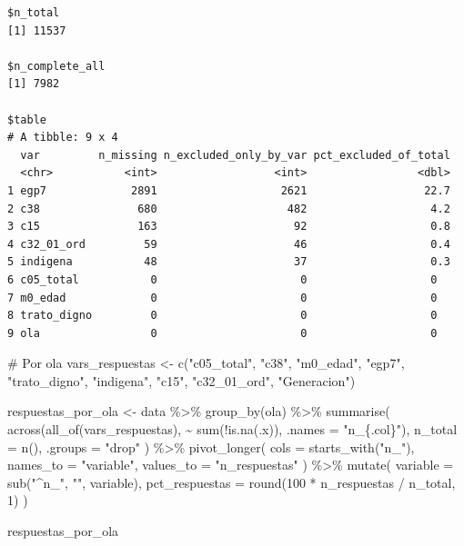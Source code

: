 \documentclass[
  spanish,
  a4paper,
  oneside]{scrbook}
\newenvironment{Shaded}{\begin{snugshade}}{\end{snugshade}}
\newcommand{\AttributeTok}[1]{\textcolor[rgb]{0.40,0.45,0.13}{#1}}
\newcommand{\CommentTok}[1]{\textcolor[rgb]{0.37,0.37,0.37}{#1}}
\newcommand{\DecValTok}[1]{\textcolor[rgb]{0.68,0.00,0.00}{#1}}
\newcommand{\FunctionTok}[1]{\textcolor[rgb]{0.28,0.35,0.67}{#1}}
\newcommand{\NormalTok}[1]{\textcolor[rgb]{0.00,0.23,0.31}{#1}}
\newcommand{\OtherTok}[1]{\textcolor[rgb]{0.00,0.23,0.31}{#1}}
\newcommand{\SpecialCharTok}[1]{\textcolor[rgb]{0.37,0.37,0.37}{#1}}
\newcommand{\StringTok}[1]{\textcolor[rgb]{0.13,0.47,0.30}{#1}}
\begin{document}
\begin{verbatim}
$n_total
[1] 11537

$n_complete_all
[1] 7982

$table
# A tibble: 9 x 4
  var         n_missing n_excluded_only_by_var pct_excluded_of_total
  <chr>           <int>                  <int>                 <dbl>
1 egp7             2891                   2621                  22.7
2 c38               680                    482                   4.2
3 c15               163                     92                   0.8
4 c32_01_ord         59                     46                   0.4
5 indigena           48                     37                   0.3
6 c05_total           0                      0                   0  
7 m0_edad             0                      0                   0  
8 trato_digno         0                      0                   0  
9 ola                 0                      0                   0  
\end{verbatim}

\begin{Shaded}
\begin{Highlighting}[]
\CommentTok{\# Por ola}
\NormalTok{vars\_respuestas }\OtherTok{\textless{}{-}} \FunctionTok{c}\NormalTok{(}\StringTok{"c05\_total"}\NormalTok{, }\StringTok{"c38"}\NormalTok{, }\StringTok{"m0\_edad"}\NormalTok{, }\StringTok{"egp7"}\NormalTok{,}
                     \StringTok{"trato\_digno"}\NormalTok{, }\StringTok{"indigena"}\NormalTok{, }\StringTok{"c15"}\NormalTok{, }\StringTok{"c32\_01\_ord"}\NormalTok{, }\StringTok{"Generacion"}\NormalTok{)}

\NormalTok{respuestas\_por\_ola }\OtherTok{\textless{}{-}}\NormalTok{ data }\SpecialCharTok{\%\textgreater{}\%}
  \FunctionTok{group\_by}\NormalTok{(ola) }\SpecialCharTok{\%\textgreater{}\%}
  \FunctionTok{summarise}\NormalTok{(}
    \FunctionTok{across}\NormalTok{(}\FunctionTok{all\_of}\NormalTok{(vars\_respuestas), }\SpecialCharTok{\textasciitilde{}} \FunctionTok{sum}\NormalTok{(}\SpecialCharTok{!}\FunctionTok{is.na}\NormalTok{(.x)), }\AttributeTok{.names =} \StringTok{"n\_\{.col\}"}\NormalTok{),}
    \AttributeTok{n\_total =} \FunctionTok{n}\NormalTok{(),}
    \AttributeTok{.groups =} \StringTok{"drop"}
\NormalTok{  ) }\SpecialCharTok{\%\textgreater{}\%}
  \FunctionTok{pivot\_longer}\NormalTok{(}
    \AttributeTok{cols =} \FunctionTok{starts\_with}\NormalTok{(}\StringTok{"n\_"}\NormalTok{),}
    \AttributeTok{names\_to =} \StringTok{"variable"}\NormalTok{,}
    \AttributeTok{values\_to =} \StringTok{"n\_respuestas"}
\NormalTok{  ) }\SpecialCharTok{\%\textgreater{}\%}
  \FunctionTok{mutate}\NormalTok{(}
    \AttributeTok{variable =} \FunctionTok{sub}\NormalTok{(}\StringTok{"\^{}n\_"}\NormalTok{, }\StringTok{""}\NormalTok{, variable),}
    \AttributeTok{pct\_respuestas =} \FunctionTok{round}\NormalTok{(}\DecValTok{100} \SpecialCharTok{*}\NormalTok{ n\_respuestas }\SpecialCharTok{/}\NormalTok{ n\_total, }\DecValTok{1}\NormalTok{)}
\NormalTok{  )}

\NormalTok{respuestas\_por\_ola}
\end{Highlighting}
\end{Shaded}
\end{document}
